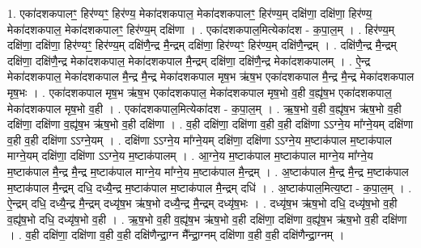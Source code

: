 \documentclass[17pt]{extarticle}
\begin{document}
1. एका॑दशकपालꣳ॒॒ हिर॑ण्यꣳ॒॒ हिर॑ण्य॒ मेका॑दशकपाल॒ मेका॑दशकपालꣳ॒॒ हिर॑ण्य॒म् दक्षि॑णा॒ दक्षि॑णा॒ हिर॑ण्य॒ मेका॑दशकपाल॒ मेका॑दशकपालꣳ॒॒ हिर॑ण्य॒म् दक्षि॑णा । . एका॑दशकपाल॒मित्येका॑दश - क॒पा॒ल॒म् । . हिर॑ण्य॒म् दक्षि॑णा॒ दक्षि॑णा॒ हिर॑ण्यꣳ॒॒ हिर॑ण्य॒म् दक्षि॑णै॒न्द्र मै॒न्द्रम् दक्षि॑णा॒ हिर॑ण्यꣳ॒॒ हिर॑ण्य॒म् दक्षि॑णै॒न्द्रम् । . दक्षि॑णै॒न्द्र मै॒न्द्रम् दक्षि॑णा॒ दक्षि॑णै॒न्द्र मेका॑दशकपाल॒ मेका॑दशकपाल मै॒न्द्रम् दक्षि॑णा॒ दक्षि॑णै॒न्द्र मेका॑दशकपालम् । . ऐ॒न्द्र मेका॑दशकपाल॒ मेका॑दशकपाल मै॒न्द्र मै॒न्द्र मेका॑दशकपाल मृष॒भ ऋ॑ष॒भ एका॑दशकपाल मै॒न्द्र मै॒न्द्र मेका॑दशकपाल मृष॒भः । . एका॑दशकपाल मृष॒भ ऋ॑ष॒भ एका॑दशकपाल॒ मेका॑दशकपाल मृष॒भो व॒ही व॒ह्यृ॑ष॒भ एका॑दशकपाल॒ मेका॑दशकपाल मृष॒भो व॒ही । . एका॑दशकपाल॒मित्येका॑दश - क॒पा॒ल॒म् । . ऋ॒ष॒भो व॒ही व॒ह्यृ॑ष॒भ ऋ॑ष॒भो व॒ही दक्षि॑णा॒ दक्षि॑णा व॒ह्यृ॑ष॒भ ऋ॑ष॒भो व॒ही दक्षि॑णा । . व॒ही दक्षि॑णा॒ दक्षि॑णा व॒ही व॒ही दक्षि॑णा ऽऽग्ने॒य मा᳚ग्ने॒यम् दक्षि॑णा व॒ही व॒ही दक्षि॑णा ऽऽग्ने॒यम् । . दक्षि॑णा ऽऽग्ने॒य मा᳚ग्ने॒यम् दक्षि॑णा॒ दक्षि॑णा ऽऽग्ने॒य म॒ष्टाक॑पाल म॒ष्टाक॑पाल माग्ने॒यम् दक्षि॑णा॒ दक्षि॑णा ऽऽग्ने॒य म॒ष्टाक॑पालम् । . आ॒ग्ने॒य म॒ष्टाक॑पाल म॒ष्टाक॑पाल माग्ने॒य मा᳚ग्ने॒य म॒ष्टाक॑पाल मै॒न्द्र मै॒न्द्र म॒ष्टाक॑पाल माग्ने॒य मा᳚ग्ने॒य म॒ष्टाक॑पाल मै॒न्द्रम् । . अ॒ष्टाक॑पाल मै॒न्द्र मै॒न्द्र म॒ष्टाक॑पाल म॒ष्टाक॑पाल मै॒न्द्रम् दधि॒ दध्यै॒न्द्र म॒ष्टाक॑पाल म॒ष्टाक॑पाल मै॒न्द्रम् दधि॑ । . अ॒ष्टाक॑पाल॒मित्य॒ष्टा - क॒पा॒ल॒म् । . ऐ॒न्द्रम् दधि॒ दध्यै॒न्द्र मै॒न्द्रम् दध्यृ॑ष॒भ ऋ॑ष॒भो दध्यै॒न्द्र मै॒न्द्रम् दध्यृ॑ष॒भः । . दध्यृ॑ष॒भ ऋ॑ष॒भो दधि॒ दध्यृ॑ष॒भो व॒ही व॒ह्यृ॑ष॒भो दधि॒ दध्यृ॑ष॒भो व॒ही । . ऋ॒ष॒भो व॒ही व॒ह्यृ॑ष॒भ ऋ॑ष॒भो व॒ही दक्षि॑णा॒ दक्षि॑णा व॒ह्यृ॑ष॒भ ऋ॑ष॒भो व॒ही दक्षि॑णा । . व॒ही दक्षि॑णा॒ दक्षि॑णा व॒ही व॒ही दक्षि॑णैन्द्रा॒ग्न मै᳚न्द्रा॒ग्नम् दक्षि॑णा व॒ही व॒ही दक्षि॑णैन्द्रा॒ग्नम् । \newline
\end{document}
